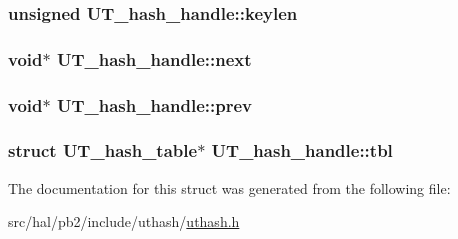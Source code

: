 \subsubsection[{\texorpdfstring{keylen}{keylen}}]{\setlength{\rightskip}{0pt plus 5cm}unsigned U\+T\+\_\+hash\+\_\+handle\+::keylen}\hypertarget{struct_u_t__hash__handle_af2abdc405972a6bbdee2ade2c0f346c4}{}\label{struct_u_t__hash__handle_af2abdc405972a6bbdee2ade2c0f346c4}
\subsubsection[{\texorpdfstring{next}{next}}]{\setlength{\rightskip}{0pt plus 5cm}void$\ast$ U\+T\+\_\+hash\+\_\+handle\+::next}\hypertarget{struct_u_t__hash__handle_a93bc88ffe97f85ea0d9e0056b7118942}{}\label{struct_u_t__hash__handle_a93bc88ffe97f85ea0d9e0056b7118942}
\subsubsection[{\texorpdfstring{prev}{prev}}]{\setlength{\rightskip}{0pt plus 5cm}void$\ast$ U\+T\+\_\+hash\+\_\+handle\+::prev}\hypertarget{struct_u_t__hash__handle_abaf54a69367933df2d45575f48ca6a58}{}\label{struct_u_t__hash__handle_abaf54a69367933df2d45575f48ca6a58}
\subsubsection[{\texorpdfstring{tbl}{tbl}}]{\setlength{\rightskip}{0pt plus 5cm}struct {\bf U\+T\+\_\+hash\+\_\+table}$\ast$ U\+T\+\_\+hash\+\_\+handle\+::tbl}\hypertarget{struct_u_t__hash__handle_ad2035ee3b2aa55b22e352341372a5e73}{}\label{struct_u_t__hash__handle_ad2035ee3b2aa55b22e352341372a5e73}


The documentation for this struct was generated from the following file\+:\begin{DoxyCompactItemize}
\item 
src/hal/pb2/include/uthash/\hyperlink{uthash_8h}{uthash.\+h}\end{DoxyCompactItemize}
